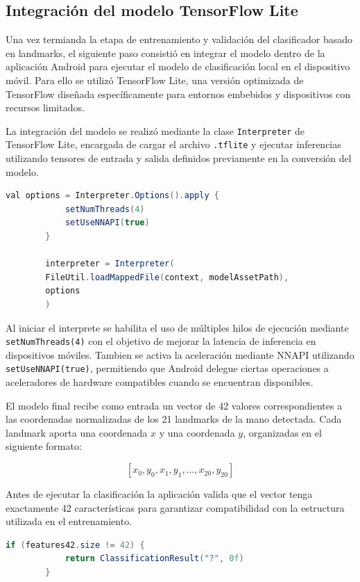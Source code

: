 	\subsection{Integración del modelo TensorFlow Lite}
	
	Una vez termianda la etapa de entrenamiento y validación del clasificador basado en landmarks, el siguiente paso consistió en integrar el modelo dentro de la aplicación Android para ejecutar el modelo de clasificación local  en el dispositivo móvil. Para ello se utilizó TensorFlow Lite, una versión optimizada de TensorFlow diseñada específicamente para entornos embebidos y dispositivos con recursos limitados.
	
	La integración del modelo se realizó mediante la clase \texttt{Interpreter} de TensorFlow Lite, encargada de cargar el archivo \texttt{.tflite} y ejecutar inferencias utilizando tensores de entrada y salida definidos previamente en la conversión del modelo.
	
	\begin{lstlisting}[language=Java]
		val options = Interpreter.Options().apply {
			setNumThreads(4)
			setUseNNAPI(true)
		}
		
		interpreter = Interpreter(
		FileUtil.loadMappedFile(context, modelAssetPath),
		options
		)
	\end{lstlisting}
	
	Al iniciar el interprete se habilita el uso de múltiples hilos de ejecución mediante \texttt{setNumThreads(4)} con el objetivo de mejorar la latencia de inferencia en dispositivos móviles. Tambien se activa la aceleración mediante NNAPI utilizando \texttt{setUseNNAPI(true)}, permitiendo que Android delegue ciertas operaciones a aceleradores de hardware compatibles cuando se encuentran disponibles.
	
	El modelo final recibe como entrada un vector de 42 valores correspondientes a las coordenadas normalizadas de los 21 landmarks de la mano detectada. Cada landmark aporta una coordenada \(x\) y una coordenada \(y\), organizadas en el siguiente formato:
	
	\[
	[x_0,y_0,x_1,y_1,\ldots,x_{20},y_{20}]
	\]
	
	Antes de ejecutar la clasificación la aplicación valida que el vector tenga exactamente 42 características para garantizar compatibilidad con la estructura utilizada en el entrenamiento.
	
	\begin{lstlisting}[language=Java]
		if (features42.size != 42) {
			return ClassificationResult("?", 0f)
		}
	\end{lstlisting}
	
